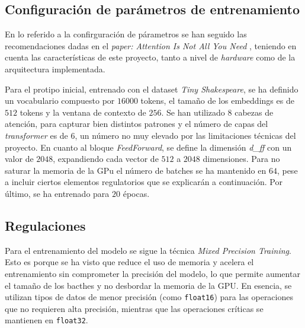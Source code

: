 \documentclass[11pt]{book}
\theoremstyle{plain}
\theoremstyle{definition}
\begin{document}
\subsection{Configuración de parámetros de entrenamiento}

En lo referido a la confirguración de párametros se han seguido las recomendaciones dadas en el \textit{paper: Attention Is Not All You Need} \parencite{gerber2025ffn}, teniendo en cuenta las características de este proyecto, tanto a nivel de  \textit{hardware} como de la arquitectura implementada.

Para el protipo inicial, entrenado con el dataset \textit{Tiny Shakespeare}, se ha definido un vocabulario compuesto por $16000$ tokens, el tamaño de los embeddings es de $512$ tokens y la ventana de contexto de $256$. Se han utilizado $8$ cabezas de atención, para capturar bien distintos patrones y el número de capas del \textit{transformer} es de $6$, un número no muy elevado por las limitaciones técnicas del proyecto. En cuanto al bloque \textit{FeedForward}, se define la dimensión \textit{d\_ff} con un valor de $2048$, expandiendo cada vector de $512$ a $2048$ dimensiones. Para no saturar la memoria de la GPu el número de batches se ha mantenido en $64$, pese a incluir ciertos elementos regulatorios que se explicarán a continuación. Por último, se ha entrenado para $20$ épocas.


\subsection{Regulaciones}

Para el entrenamiento del modelo se sigue la técnica \textit{Mixed Precision Training}. Esto es porque se ha visto que reduce el uso de memoria y acelera el entrenamiento sin comprometer la precisión del modelo, lo que permite aumentar el tamaño de los bacthes y no desbordar la memoria de la GPU. En esencia, se utilizan tipos de datos de menor precisión (como \texttt{float16}) para las operaciones que no requieren alta precisión, mientras que las operaciones críticas se mantienen en \texttt{float32}. 
\end{document}
